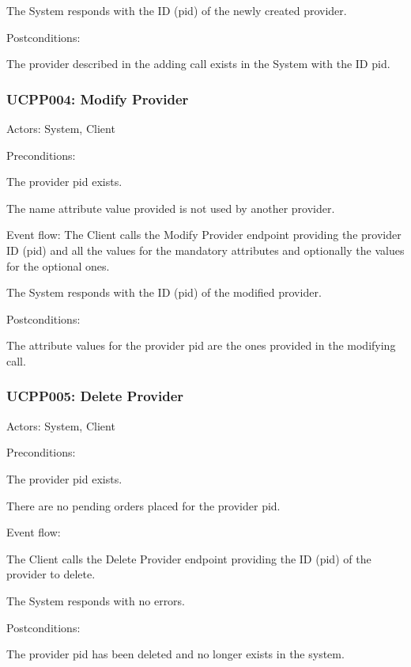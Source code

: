 \ucitem The System responds with the ID (pid) of the newly created provider.

Postconditions:

\ucitem The provider described in the adding call exists in the System with the ID pid.

\subsubsection{UCPP004: Modify Provider}
\label{UCPP004}

Actors: System, Client

Preconditions:

\ucitem The provider pid exists.

\ucitem The name attribute value provided is not used by another provider.

Event flow:
\ucitem The Client calls the Modify Provider endpoint providing the provider ID (pid) and all the values for the mandatory attributes and optionally the values for the optional 
ones.

\ucitem The System responds with the ID (pid) of the modified provider.

Postconditions:

\ucitem The attribute values for the provider pid are the ones provided in the modifying call.

\subsubsection{UCPP005: Delete Provider}
\label{UCPP005}

Actors: System, Client

Preconditions:

\ucitem The provider pid exists.

\ucitem There are no pending orders placed for the provider pid.

Event flow:

\ucitem The Client calls the Delete Provider endpoint providing the ID (pid) of the provider to delete.

\ucitem The System responds with no errors.

Postconditions:

\ucitem The provider pid has been deleted and no longer exists in the system.